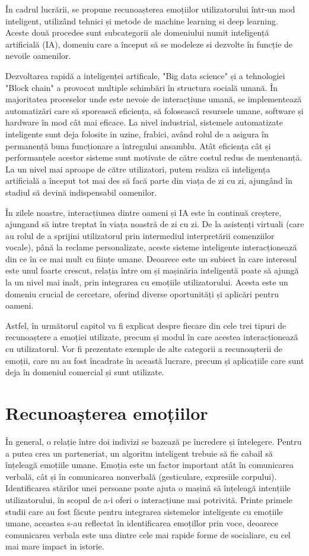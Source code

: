 \documentclass[a4paper, 12pt]{report}
\begin{document}
	În cadrul lucrării, se propune recunoașterea emoțiilor utilizatorului într-un mod inteligent, utilizând tehnici și metode de machine learning si deep learning. Aceste două procedee sunt subcategorii ale domeniului numit inteligență artificială (IA), domeniu care a început să se modeleze si dezvolte în funcție de nevoile oamenilor.
	
	Dezvoltarea rapidă a inteligenței artificale, "Big data science" și a tehnologiei "Block chain" a provocat multiple schimbări în structura socială umană. În majoritatea proceselor unde este nevoie de interacțiune umană, se implementează automatizări care să sporească eficiența, să folosească resursele umane, software și hardware în mod cât mai eficace. La nivel industrial, sistemele automatizate inteligente sunt deja folosite in uzine, frabici, având rolul de a asigura în permanență buna funcționare a întregului ansamblu. Atât eficiența cât și performanțele acestor sisteme sunt motivate de către costul redus de mentenanță. La un nivel mai aproape de către utilizatori, putem realiza că inteligența artificială a început tot mai des să facă parte din viața de zi cu zi, ajungând în stadiul să devină indispensabil oamenilor.
	
	În zilele noastre, interacțiunea dintre oameni și IA este în continuă creștere, ajungand să intre treptat în viața noastră de zi cu zi. De la asistenți virtuali (care au rolul de a sprijini utilizatorul prin intermediul interpretării comenziilor vocale), până la reclame personalizate, aceste sisteme inteligente interacționează din ce în ce mai mult cu ființe umane. Deoarece este un subiect în care interesul este unul foarte crescut, relația între om și mașinăria inteligentă poate să ajungă la un nivel mai inalt, prin integrarea cu emoțiile utilizatorului. Acesta este un domeniu crucial de cercetare, oferind diverse oportunități și aplicări pentru oameni.
	
	Astfel, în următorul capitol va fi explicat despre fiecare din cele trei tipuri de recunoaștere a emoției utilizate, precum și modul în care acestea interacționează cu utilizatorul. Vor fi prezentate exemple de alte categorii a recunoașterii de emoții, care nu au fost încadrate în această lucrare, precum și aplicațiile care sunt deja în domeniul comercial și sunt utilizate.
	
	\clearpage
	\section{Recunoașterea emoțiilor}
	În general, o relație între doi indivizi se bazează pe încredere și întelegere. Pentru a putea crea un parteneriat, un algoritm inteligent trebuie să fie cabail să înțeleagă emoțiile umane. Emoția este un factor important atât în comunicarea verbală, cât și în comunicarea nonverbală (gesticulare, expresiile corpului). Identificarea stărilor unei persoane poate ajuta o mașină să înțeleagă intențiile utilizatorului, în scopul de a-i oferi o interacțiune mai potrivită. Printe primele studii care au fost făcute pentru integrarea sistemelor inteligente cu emoțiile umane, aceastea s-au reflectat în identificarea emoțillor prin voce, deoarece comunicarea verbala este una dintre cele mai rapide forme de socialiare, cu cel mai mare impact in istorie.
	
\end{document}
